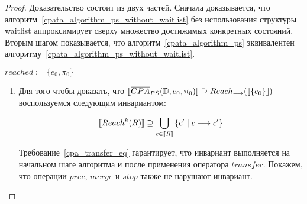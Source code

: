 \begin{proof}

Доказательство состоит из двух частей. Сначала доказывается, что алгоритм~\ref{cpata_algorithm_ps_without_waitlist} без использования структуры waitlist аппроксимирует сверху множество достижимых конкретных состояний. Вторым шагом показывается, что алгоритм~\ref{cpata_algorithm_ps} эквивалентен алгоритму~\ref{cpata_algorithm_ps_without_waitlist}.

\begin{algorithm}[H]
 $reached := \{e_0,\pi_0\} $\;
 

 \caption{$\overline{CPA}_{PS}(\mathbb{D}, e_0, \pi_0)$}
 \label{cpata_algorithm_ps_without_waitlist}
\end{algorithm}

\begin{enumerate}
\item Для того чтобы доказать, что $[\![ \overline{CPA}_{PS}(\mathbb{D}, e_0, \uppi_0) ]\!] \supseteq Reach_{\longrightarrow}([\![ \{e_0\} ]\!])$ воспользуемся следующим инвариантом:

\begin{equation}
\label{cpa_algorithm_invariant}
\begin{aligned}
\conc{Reach^k(R)} \supseteq \bigcup_{c \in \conc{R}}{\{c' \mid c \tcarrow c'\}}
\end{aligned}
\end{equation}

Требование~\ref{cpa_transfer_eq} гарантирует, что инвариант выполняется на начальном шаге алгоритма и после применения оператора $transfer$.
Покажем, что операции $prec$, $merge$ и $stop$ также не нарушают инвариант.


\end{enumerate}
\end{proof}
